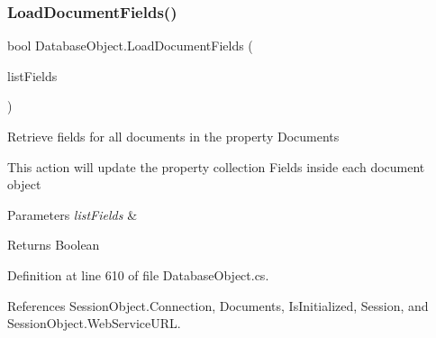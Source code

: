 \subsubsection{\texorpdfstring{Load\+Document\+Fields()}{LoadDocumentFields()}\hspace{0.1cm}{\footnotesize\ttfamily [2/2]}}
{\footnotesize\ttfamily bool Database\+Object.\+Load\+Document\+Fields (\begin{DoxyParamCaption}\item[{I\+List}]{list\+Fields }\end{DoxyParamCaption})}



Retrieve fields for all documents in the property \textquotesingle{}Documents\textquotesingle{} 

This action will update the property collection Fields inside each document object


\begin{DoxyParams}{Parameters}
{\em list\+Fields} & \\
\hline
\end{DoxyParams}
\begin{DoxyReturn}{Returns}
Boolean
\end{DoxyReturn}


Definition at line 610 of file Database\+Object.\+cs.



References Session\+Object.\+Connection, Documents, Is\+Initialized, Session, and Session\+Object.\+Web\+Service\+U\+RL.


